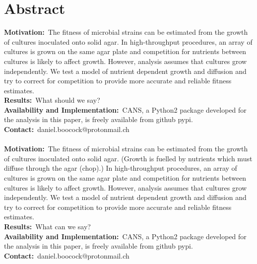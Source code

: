 \section*{Abstract}
\label{sec:abstract}

\textbf{Motivation:}~The fitness of microbial strains can be estimated
from the growth of cultures inoculated onto solid agar. In
high-throughput procedures, an array of cultures is grown on the same
agar plate and competition for nutrients between cultures is likely to
affect growth. However, analysis assumes that cultures grow
independently. We test a model of nutrient dependent growth and
diffusion and try to
correct for competition to provide more accurate and reliable fitness estimates.\\
\textbf{Results:}~What should we say?\\
\textbf{Availability and Implementation:}~CANS, a Python2 package developed for the analysis in this paper, is freely available from github pypi.\\
\textbf{Contact:}~daniel.boocock@protonmail.ch\\
\\

\textbf{Motivation:}~The fitness of microbial strains can be estimated
from the growth of cultures inoculated onto solid agar. (Growth is
fuelled by nutrients which must diffuse through the agar (chop).) In
high-throughput procedures, an array of cultures is grown on the same
agar plate and competition for nutrients between cultures is likely to affect
growth. However, analysis assumes that cultures grow independently. We
test a model of nutrient dependent growth and diffusion and try to
correct for competition to provide more accurate and reliable fitness estimates.\\
\textbf{Results:}~What can we say?\\
\textbf{Availability and Implementation:}~CANS, a Python2 package developed for the analysis in this paper, is freely available from github pypi.\\
\textbf{Contact:}~daniel.boocock@protonmail.ch\\

